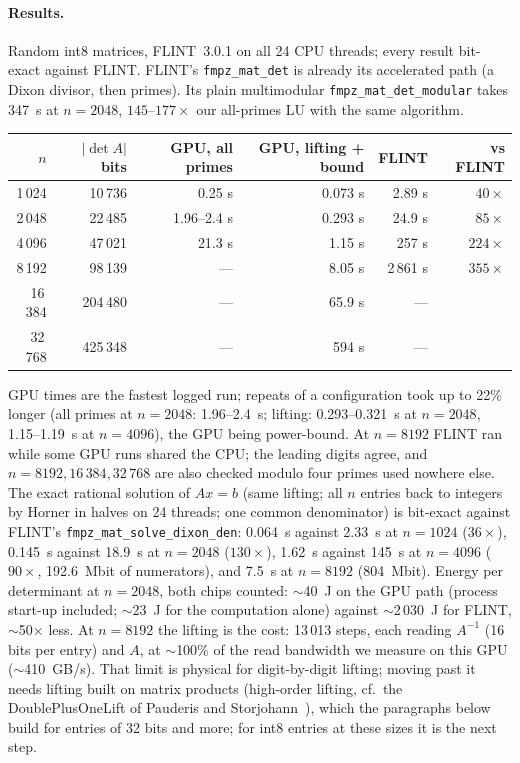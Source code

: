 \documentclass[11pt]{article}
\begin{document}
\paragraph{Results.} Random int8 matrices, FLINT~3.0.1 on all 24 CPU threads; every result bit-exact against FLINT.
FLINT's \texttt{fmpz\_mat\_det} is already its accelerated path (a Dixon divisor, then primes). Its plain multimodular
\texttt{fmpz\_mat\_det\_modular} takes 347~s at $n=2048$, $145$--$177\times$ our all-primes LU with the same algorithm.
\begin{center}\small\begin{tabular}{rrrrrr}\toprule
$n$ & $|\det A|$ bits & GPU, all primes & GPU, lifting + bound & FLINT & vs FLINT \\\midrule
1\,024 & 10\,736 & 0.25 s & 0.073 s & 2.89 s & $40\times$ \\
2\,048 & 22\,485 & 1.96--2.4 s & 0.293 s & 24.9 s & $85\times$ \\
4\,096 & 47\,021 & 21.3 s & 1.15 s & 257 s & $224\times$ \\
8\,192 & 98\,139 & --- & 8.05 s & 2\,861 s & $355\times$ \\
16\,384 & 204\,480 & --- & 65.9 s & --- & \\
32\,768 & 425\,348 & --- & 594 s & --- & \\\bottomrule
\end{tabular}\end{center}
GPU times are the fastest logged run; repeats of a configuration took up to 22\% longer (all primes at $n=2048$: 1.96--2.4~s; lifting: 0.293--0.321~s at $n=2048$, 1.15--1.19~s at $n=4096$), the GPU being power-bound. At $n=8192$ FLINT ran while some GPU runs shared the CPU; the leading digits agree, and $n=8192, 16\,384, 32\,768$ are also checked
modulo four primes used nowhere else. The exact rational solution of $Ax=b$ (same lifting; all $n$ entries back to
integers by Horner in halves on 24 threads; one common denominator) is bit-exact against FLINT's
\texttt{fmpz\_mat\_solve\_dixon\_den}: 0.064~s against 2.33~s at $n=1024$ ($36\times$), 0.145~s against 18.9~s at $n=2048$
($130\times$), 1.62~s against 145~s at $n=4096$ ($90\times$, 192.6~Mbit of numerators), and 7.5~s at $n=8192$ (804~Mbit).
Energy per determinant at $n=2048$, both chips counted: $\sim$40~J on the GPU path (process start-up included; $\sim$23~J for the
computation alone) against $\sim$2\,030~J for FLINT, $\sim$50$\times$ less. At $n=8192$ the lifting is the cost: 13\,013 steps,
each reading $A^{-1}$ (16 bits per entry) and $A$, at $\sim$100\% of the read bandwidth we measure on this GPU ($\sim$410~GB/s).
That limit is physical for digit-by-digit lifting; moving past it needs lifting built on matrix products (high-order lifting,
cf.\ the DoublePlusOneLift of Pauderis and Storjohann~\cite{ps}), which the paragraphs below build for entries of 32 bits
and more; for int8 entries at these sizes it is the next step.
\end{document}
